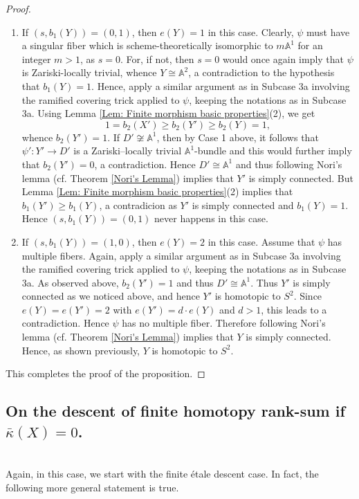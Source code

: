 \documentclass[12pt,reqno,twoside]{amsart}
\theoremstyle{definition}
\numberwithin{equation}{section}
\newcommand{\A}{\mathbb{A}}
\newcommand{\Kbar}{\bar{\kappa}}
\begin{document}
\begin{proof}
    \begin{enumerate}[\indent---]
        \item If $(s, b_1(Y))=(0,1)$, then $e(Y)=1$ in this case. Clearly, $\psi$ must have a singular fiber which is scheme-theoretically isomorphic to $m\A^1$ for an integer $m>1$, as $s=0$. For, if not, then $s=0$ would once again imply that $\psi$ is Zariski-locally trivial, whence $Y\cong \A^2$, a contradiction to the hypothesis that $b_1(Y)=1$. Hence, apply a similar argument as in {\sf Subcase 3a} involving the ramified covering trick applied to $\psi$, keeping the notations as in {\sf Subcase 3a}. Using Lemma \ref{Lem: Finite morphism basic properties}(2), we get $$1=b_2(X')\geq b_2(Y')\geq b_2(Y)=1,$$ whence $b_2(Y')=1$. If $D'\not\cong\A^1$, then by {\sf Case 1} above, it follows that $\psi': Y'\to D'$ is a Zariski--locally trivial $\A^1$-bundle and this would further imply that $b_2(Y')=0$, a contradiction. Hence $D'\cong \A^1$ and thus \cite[Remark 3.13, 3.14]{GGH2023} following Nori's lemma (cf. Theorem \ref{Nori's Lemma}) implies that $Y'$ is simply connected. But Lemma \ref{Lem: Finite morphism basic properties}(2) implies that $b_1(Y')\geq b_1(Y)$, a contradicion as $Y'$ is simply connected and $b_1(Y)=1$. Hence $(s, b_1(Y))=(0,1)$ never happens in this case.

        \medskip
        \item If $(s, b_1(Y))=(1,0)$, then $e(Y)=2$ in this case. Assume that $\psi$ has multiple fibers. Again, apply a similar argument as in {\sf Subcase 3a} involving the ramified covering trick applied to $\psi$, keeping the notations as in {\sf Subcase 3a}. As observed above, $b_2(Y')=1$ and thus $D'\cong \A^1$. Thus $Y'$ is simply connected as we noticed above, and hence $Y'$ is homotopic to $S^2$. Since $e(Y)=e(Y')=2$ with $e(Y')=d\cdot e(Y)$ and $d>1$, this leads to a contradiction. Hence $\psi$ has no multiple fiber. Therefore \cite[Remark 3.13, 3.14]{GGH2023} following Nori's lemma (cf. Theorem \ref{Nori's Lemma}) implies that $Y$ is simply connected. Hence, as shown previously, $Y$ is homotopic to $S^2$. 
    \end{enumerate}
    This completes the proof of the proposition.
\end{proof}

\subsection{On the descent of finite homotopy rank-sum if $\Kbar(X)=0$.}\mbox{}\\
Again, in this case, we start with the finite {\'e}tale descent case. In fact, the following more general statement is true.
\end{document}
